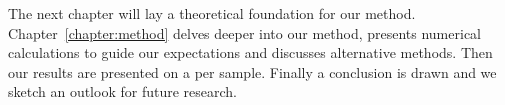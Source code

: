 
The next chapter will lay a theoretical foundation for our method. Chapter~\ref{chapter:method} delves deeper into our method, presents numerical calculations to guide our expectations and discusses alternative methods. Then our results are presented on a per sample. Finally a conclusion is drawn and we sketch an outlook for future research.